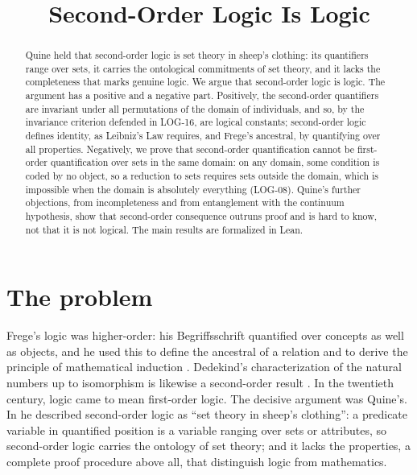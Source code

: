 \documentclass{situationist-preprint}
\title{Second-Order Logic Is Logic}
\begin{document}
\maketitle

\begin{abstract}
Quine held that second-order logic is set theory in sheep's clothing: its quantifiers range over sets, it carries the ontological commitments of set theory, and it lacks the completeness that marks genuine logic. We argue that second-order logic is logic. The argument has a positive and a negative part. Positively, the second-order quantifiers are invariant under all permutations of the domain of individuals, and so, by the invariance criterion defended in LOG-16, are logical constants; second-order logic defines identity, as Leibniz's Law requires, and Frege's ancestral, by quantifying over all properties. Negatively, we prove that second-order quantification cannot be first-order quantification over sets in the same domain: on any domain, some condition is coded by no object, so a reduction to sets requires sets outside the domain, which is impossible when the domain is absolutely everything (LOG-08). Quine's further objections, from incompleteness and from entanglement with the continuum hypothesis, show that second-order consequence outruns proof and is hard to know, not that it is not logical. The main results are formalized in Lean.
\end{abstract}

\section{The problem}

Frege's logic was higher-order: his Begriffsschrift quantified over concepts as well as objects, and he used this to define the ancestral of a relation and to derive the principle of mathematical induction \citep{Frege1879}. Dedekind's characterization of the natural numbers up to isomorphism is likewise a second-order result \citep{Dedekind1888}. In the twentieth century, logic came to mean first-order logic. The decisive argument was Quine's. In \citet{Quine1970} he described second-order logic as \enquote{set theory in sheep's clothing}: a predicate variable in quantified position is a variable ranging over sets or attributes, so second-order logic carries the ontology of set theory; and it lacks the properties, a complete proof procedure above all, that distinguish logic from mathematics.
\end{document}
